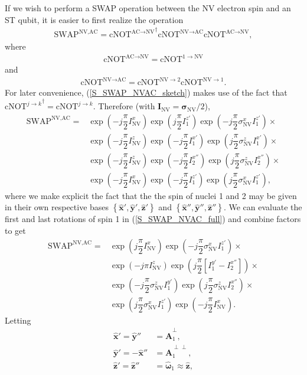 \documentclass[twocolumn]{revtex4-1}
\renewcommand{\t}{\text} %
\newcommand{\f}[2]{\dfrac{#1}{#2}} %
\newcommand{\p}[1]{\left(#1\right)} %
\renewcommand{\sp}[1]{\left[#1\right]} %
\renewcommand{\set}[1]{\left\{#1\right\}} %
\renewcommand{\v}{\bm} %
\newcommand{\uv}[1]{\hat{\v{#1}}} %
\newcommand{\SWAP}{\t{SWAP}}
\newcommand{\cNOT}{\t{cNOT}}
\newcommand{\NV}{\t{NV}}
\newcommand{\AC}{\t{AC}}
\begin{document}
If we wish to perform a SWAP operation between the NV electron spin
and an ST qubit, it is easier to first realize the operation
\begin{align}
  \SWAP^{\NV,\AC}
  = {\cNOT^{\AC\to\NV}}^\dagger\cNOT^{\NV\to\AC}\cNOT^{\AC\to\NV},
  \label{S_SWAP_NVAC_sketch}
\end{align}
where
\begin{align}
  \cNOT^{\AC\to\NV} = \cNOT^{1\to\NV}
\end{align}
and
\begin{align}
  \cNOT^{\NV\to\AC} = \cNOT^{\NV\to2}\cNOT^{\NV\to1}.
\end{align}
For later convenience, (\ref{S_SWAP_NVAC_sketch}) makes use of the
fact that ${\cNOT^{j\to k}}^\dagger=\cNOT^{j\to k}$. Therefore (with
$\v I_\NV=\v\sigma_\NV/2$),
\begin{align}
  \SWAP^{\NV,\AC}
  =& \exp\p{-j\f\pi2 I_\NV^x} \exp\p{j\f\pi2 I_1^{z'}}
     \exp\p{-j\f\pi2 \sigma_\NV^x I_1^{z'}} \times \tag*{} \\
   & \exp\p{-j\f\pi2 I_\NV^z} \exp\p{-j\f\pi2 I_1^{x'}}
     \exp\p{j\f\pi2 \sigma_\NV^z I_1^{x'}} \times \tag*{} \\
   & \exp\p{-j\f\pi2 I_\NV^z} \exp\p{-j\f\pi2 I_2^{x''}}
     \exp\p{j\f\pi2 \sigma_\NV^z I_2^{x''}} \times \tag*{} \\
   & \exp\p{-j\f\pi2 I_\NV^x} \exp\p{-j\f\pi2 I_1^{z'}}
     \exp\p{j\f\pi2 \sigma_\NV^x I_1^{z'}},
  \label{S_SWAP_NVAC_full}
\end{align}
where we make explicit the fact that the the spin of nuclei 1 and 2
may be given in their own respective bases
$\set{\uv x',\uv y',\uv z'}$ and $\set{\uv x'',\uv y'',\uv z''}$. We
can evaluate the first and last rotations of spin 1 in
(\ref{S_SWAP_NVAC_full}) and combine factors to get
\begin{align}
  \SWAP^{\NV,\AC}
  =& \exp\p{j\f\pi2 I_\NV^x} \exp\p{-j\f\pi2 \sigma_\NV^x I_1^{z'}}
     \times \tag*{} \\
   & \exp\p{-j\pi I_\NV^z} \exp\p{j\f\pi2\sp{I_1^{y'}-I_2^{x''}}}
     \times \tag*{} \\
   & \exp\p{-j\f\pi2 \sigma_\NV^z I_1^{y'}}
     \exp\p{j\f\pi2 \sigma_\NV^z I_2^{x''}} \times \tag*{} \\
   & \exp\p{j\f\pi2 \sigma_\NV^x I_1^{z'}} \exp\p{-j\f\pi2 I_\NV^x}.
\end{align}
Letting
\begin{align}
  \uv x' = \uv y'' &= \uv A_1^\perp, \\
  \uv y' = -\uv x'' &= \uv A_1^{\perp\perp}, \\
  \uv z' = \uv z'' &= \uv\omega_1\approx\uv z, \label{S_w=z}
\end{align}
\end{document}
